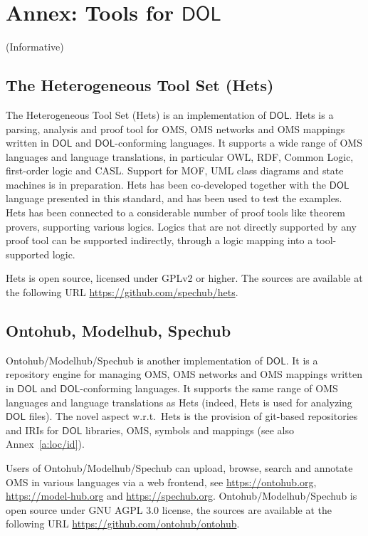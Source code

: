 \documentclass[10pt,fleqn,final]{scrreprt}
\makeatletter
\newcommand*\CommentAuthor{}
\renewcommand*\CommentAuthor{#1}}
\newcommand*\CommentDate{}
\renewcommand*\CommentDate{#1}}
\newcommand*\CommentId{}
\renewcommand*\CommentId{#1}}
\newcommand*\CommentType{}
\renewcommand*\CommentType{#1}}
\newcommand*{\SetCommentColorByType}[1]{%
\edef\localType{{#1}}%
\expandafter\ifstrequal\localType{q-aut}{\colorlet{CommentColor}{red}}{%
\expandafter\ifstrequal\localType{q-all}{\colorlet{CommentColor}{orange}}{%
\expandafter\ifstrequal\localType{todo}{\colorlet{CommentColor}{orange}}{%
\expandafter\ifstrequal\localType{fyi}{\colorlet{CommentColor}{lightgray}}{%
\colorlet{CommentColor}{yellow}}}}}}
\newcommand*{\SetCommentPrefixByType}[1]{%
\edef\localType{{#1}}%
\expandafter\@ifmtarg\localType{%
\edef\CommentPrefix{}%
}{%
\caseupper[q]{#1}%
\edef\CommentPrefix{\thestring: }%
}}
\newcommand*{\initComment}[1]{%
\setkeys{Comment}{#1}%
\SetCommentColorByType{\CommentType}%
\relax%
\SetCommentPrefixByType{\CommentType}%
\relax%
}
\newcommand*{\todonote}[2][]{%
\initComment{#1}%
\pdfcomment[author=\CommentAuthor,color=CommentColor,date=\CommentDate,id=\CommentId]{%
\CommentPrefix
#2}}
\renewcommand*{\todonote}[2][]{%
\initComment{#1}%
\ednote{\CommentPrefix #2}}
\newcommand*{\DOL}{\ensuremath{\mathsf{DOL}}\xspace}
\newcommand{\informative}[0]{{\begin{center}{\Large{(Informative})}\end{center}} \bigskip}
\newcommand{\sclause}[1]{\section{#1}}
\newcommand{\infannex}[1]{ \chapter{Annex: #1}  \informative }
\makeatother
\begin{document}





\infannex{Tools for \DOL}\label{a:tools}

\sclause{The Heterogeneous Tool Set (Hets)}\label{a:hets} The
Heterogeneous Tool Set (Hets) is  an implementation  of
\DOL. Hets is a parsing, analysis and proof tool
for OMS, OMS networks and OMS mappings written in \DOL and
\DOL-conforming languages.  It supports a wide range of OMS languages
and language translations, in particular OWL, RDF, Common Logic,
first-order logic and CASL. Support for MOF, UML class diagrams and
state machines is in preparation.  Hets has been co-developed together
with the \DOL language presented in this standard, and has been used to
test the examples. Hets has been connected to a considerable number of
proof tools like theorem provers, supporting various logics. Logics
that are not directly supported by any proof tool can be supported
indirectly, through a logic mapping into a tool-supported logic.

Hets  is open source, licensed under GPLv2 or higher. The sources are
available at the following URL \url{https://github.com/spechub/hets}.


\sclause{Ontohub, Modelhub, Spechub}\label{a:ontohub}

Ontohub/Modelhub/Spechub is  another implementation  of
\DOL. It is a repository engine for managing OMS, OMS networks and OMS
mappings written in \DOL and \DOL-conforming languages.  It supports the
same range of OMS languages and language translations as Hets (indeed,
Hets is used for analyzing \DOL files). The novel aspect w.r.t.\ Hets
is the provision of git-based repositories and IRIs for \DOL libraries,
OMS, symbols and mappings (see also Annex~\ref{a:loc/id}).

Users of Ontohub/Modelhub/Spechub can upload, browse, search and annotate 
OMS in various languages via a web frontend, 
see \url{https://ontohub.org}, \url{https://model-hub.org} and \url{https://spechub.org}.
Ontohub/Modelhub/Spechub is open source under GNU AGPL 3.0 license,  the sources are available at the following URL 
\url{https://github.com/ontohub/ontohub}.
\end{document}
